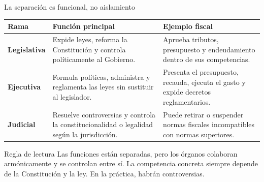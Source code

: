\documentclass{beamer}
\begin{document}
\begin{frame}{La separaci\'on es funcional, no aislamiento}
\small
\begin{tabular}{p{}p{}p{}}
\textbf{Rama} & \textbf{Funci\'on principal} & \textbf{Ejemplo fiscal} \\ \hline
\textbf{Legislativa} &
Expide leyes, reforma la Constituci\'on y controla pol\'iticamente al Gobierno. &
Aprueba tributos, presupuesto y endeudamiento dentro de sus competencias. \\[0.18cm]
\textbf{Ejecutiva} &
Formula pol\'iticas, administra y reglamenta las leyes sin sustituir al legislador. &
Presenta el presupuesto, recauda, ejecuta el gasto y expide decretos reglamentarios. \\[0.18cm]
\textbf{Judicial} &
Resuelve controversias y controla la constitucionalidad o legalidad seg\'un la jurisdicci\'on. &
Puede retirar o suspender normas fiscales incompatibles con normas superiores. \\
\end{tabular}
\vspace{0.25cm}
\begin{block}{Regla de lectura}
Las funciones est\'an separadas, pero los \'organos colaboran arm\'onicamente y se controlan entre s\'i. La competencia concreta siempre depende de la Constituci\'on y la ley. En la práctica, habrán controversias.
\end{block}
\end{frame}
\end{document}
